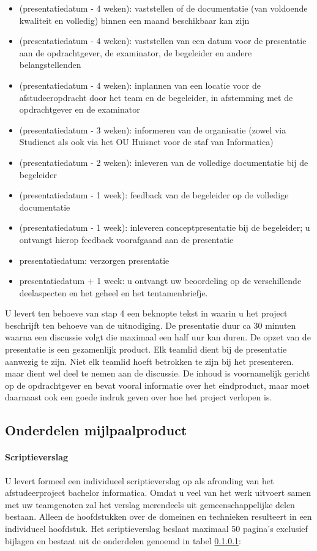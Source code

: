 \begin{itemize}
\item (presentatiedatum - 4 weken): vaststellen of de documentatie
	    (van voldoende kwaliteit en volledig) binnen een maand beschikbaar kan zijn
\item (presentatiedatum - 4 weken): vaststellen van een datum voor
	    de presentatie aan de opdrachtgever, de examinator, de begeleider en andere
	    belangstellenden
\item (presentatiedatum - 4 weken): inplannen van een locatie voor
	    de afstudeeropdracht door het team en de begeleider, in afstemming met de
	    opdrachtgever en de examinator
\item (presentatiedatum - 3 weken): informeren van de organisatie
	    (zowel via Studienet als ook via het OU Huisnet voor de staf van Informatica)
\item (presentatiedatum - 2 weken): inleveren van de volledige
	    documentatie bij de begeleider
\item (presentatiedatum - 1 week): feedback van de begeleider op de
	    volledige documentatie
\item (presentatiedatum - 1 week): inleveren conceptpresentatie bij
	    de begeleider; u ontvangt hierop feedback voorafgaand aan de presentatie
\item presentatiedatum: verzorgen presentatie
\item presentatiedatum + 1 week: u ontvangt uw beoordeling op de
	    verschillende deelaspecten en het geheel en het tentamenbriefje.
\end{itemize}


U levert ten behoeve van stap 4 een beknopte tekst in waarin u het project
beschrijft ten behoeve van de uitnodiging. De presentatie duur ca 30 minuten
waarna een discussie volgt die maximaal een half uur kan duren.
De opzet van de presentatie is een gezamenlijk product. Elk teamlid dient bij de
presentatie aanwezig te zijn. Niet elk teamlid hoeft betrokken te zijn bij het
presenteren. maar dient wel deel te nemen aan de discussie.
De inhoud is voornamelijk gericht op de opdrachtgever en bevat vooral informatie
over het eindproduct, maar moet daarnaast ook een goede indruk geven over hoe
het project verlopen is.

\subsection{Onderdelen mijlpaalproduct}
\paragraph{Scriptieverslag}
U levert formeel een individueel scriptieverslag op als afronding van
het afstudeerproject bachelor informatica. Omdat u veel van het werk uitvoert
samen met uw teamgenoten zal het verslag merendeels uit gemeenschappelijke delen
bestaan. Alleen de hoofdstukken over de domeinen en technieken resulteert in een
individueel hoofdstuk. Het scriptieverslag beslaat maximaal 50 pagina's exclusief bijlagen
en bestaat uit de onderdelen genoemd in tabel \ref{}:

